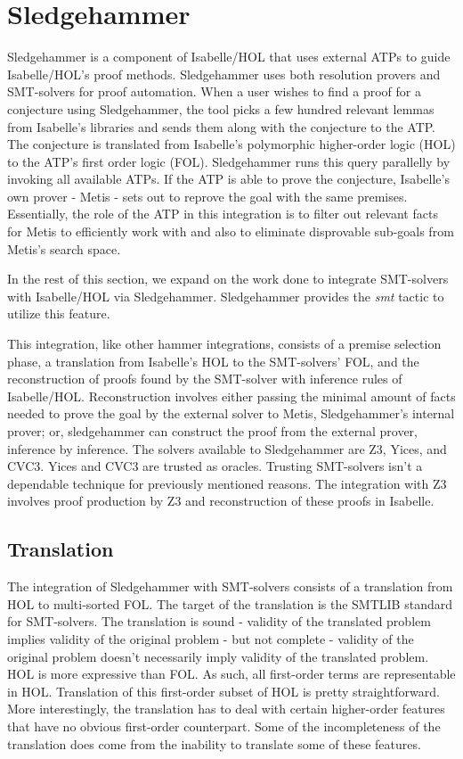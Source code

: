 \documentclass{article}
\begin{document}
\section{Sledgehammer}
\label{sec:sledgehammer}
	Sledgehammer is a component of Isabelle/HOL that uses 
	external ATPs to guide Isabelle/HOL's proof methods. 
	Sledgehammer uses both resolution provers and 
	SMT-solvers for proof automation. When a user wishes 
	to find a proof for a conjecture using Sledgehammer, 
	the tool picks a few hundred relevant lemmas from 
	Isabelle's libraries and sends them along 
	with the conjecture to the ATP. The conjecture is 
	translated from Isabelle's polymorphic higher-order 
	logic (HOL) to the ATP's first order logic (FOL).
	Sledgehammer runs this query parallelly by invoking 
	all available ATPs. If the ATP is able to prove 
	the conjecture, Isabelle's own prover - Metis - sets 
	out to reprove the goal with the same premises. 
	Essentially, the role of the ATP in this integration 
	is to filter out relevant facts for Metis to 
	efficiently work with and also to eliminate 
	disprovable sub-goals from Metis's search space.
	
	In the rest of this section, we expand on the work 
	done to integrate SMT-solvers with Isabelle/HOL via 
	Sledgehammer. Sledgehammer provides the \textit{smt}
	tactic to utilize this feature.
	
	This integration, like other hammer integrations, 
	consists of a premise selection phase, a translation 
	from Isabelle's HOL to the SMT-solvers' FOL, and the 
	reconstruction of proofs found by the SMT-solver with 
	inference rules of Isabelle/HOL. Reconstruction involves 
	either passing the minimal amount of facts needed 
	to prove the goal by the external solver to Metis, 
	Sledgehammer's internal prover; or, sledgehammer 
	can construct the proof from the external prover, 
	inference by inference.	The solvers available to 
	Sledgehammer are Z3, Yices, and CVC3. Yices and CVC3 
	are trusted as oracles.	Trusting SMT-solvers isn't a 
	dependable technique for previously mentioned reasons. 
	The integration with Z3 involves proof production by 
	Z3 and reconstruction of these proofs in Isabelle.
	
	\subsection{Translation}
		The integration of Sledgehammer with SMT-solvers 
		consists of a translation from HOL 
		to multi-sorted FOL. The target 
		of the translation is the SMTLIB standard for 
		SMT-solvers. The translation is sound - 
		validity of the translated problem implies 
		validity of the original problem - but not 
		complete - validity of the original problem 
		doesn't necessarily imply validity of the 
		translated problem. HOL is more expressive 
		than FOL. As such, all first-order terms 
		are representable in HOL. Translation of this 
		first-order subset of HOL is pretty straightforward. 
		More interestingly, the translation has to deal 
		with certain higher-order features that have 
		no obvious first-order counterpart. Some of 
		the incompleteness of the translation does 
		come from the inability to translate some 
		of these features.
		
\end{document}
